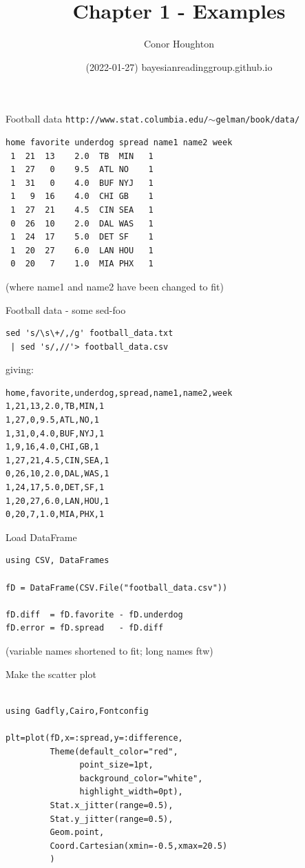 \documentclass{beamer}
\title[Chapter 1]{Chapter 1 - Examples}
\author{Conor Houghton}
\institute{reading Gelman}
\date{(2022-01-27) bayesianreadinggroup.github.io}
\begin{document}
\maketitle

\begin{frame}[fragile]{Football data}
\texttt{http://www.stat.columbia.edu/$\sim$gelman/book/data/}

\begin{verbatim}
home favorite underdog spread name1 name2 week
 1  21  13    2.0  TB  MIN   1
 1  27   0    9.5  ATL NO    1
 1  31   0    4.0  BUF NYJ   1
 1   9  16    4.0  CHI GB    1
 1  27  21    4.5  CIN SEA   1
 0  26  10    2.0  DAL WAS   1
 1  24  17    5.0  DET SF    1
 1  20  27    6.0  LAN HOU   1
 0  20   7    1.0  MIA PHX   1
\end{verbatim}
\vfill
\color{gray}
(where name1 and name2 have been changed to fit)
\color{black}
\end{frame}


\begin{frame}[fragile]{Football data - some sed-foo}
\begin{verbatim}
sed 's/\s\+/,/g' football_data.txt
 | sed 's/,//'> football_data.csv
\end{verbatim}
\color{red}giving:\color{black}
\begin{verbatim}
home,favorite,underdog,spread,name1,name2,week
1,21,13,2.0,TB,MIN,1
1,27,0,9.5,ATL,NO,1
1,31,0,4.0,BUF,NYJ,1
1,9,16,4.0,CHI,GB,1
1,27,21,4.5,CIN,SEA,1
0,26,10,2.0,DAL,WAS,1
1,24,17,5.0,DET,SF,1
1,20,27,6.0,LAN,HOU,1
0,20,7,1.0,MIA,PHX,1
\end{verbatim}
\end{frame}

\begin{frame}[fragile]{Load DataFrame}
\begin{lstlisting}
using CSV, DataFrames

fD = DataFrame(CSV.File("football_data.csv"))

fD.diff  = fD.favorite - fD.underdog
fD.error = fD.spread   - fD.diff
\end{lstlisting}
\vfill
\color{gray}
(variable names shortened to fit; long names ftw)
\color{black}

\end{frame}

\begin{frame}[fragile]{Make the scatter plot}
  \begin{lstlisting}

using Gadfly,Cairo,Fontconfig

plt=plot(fD,x=:spread,y=:difference,
         Theme(default_color="red",
               point_size=1pt,
               background_color="white",
               highlight_width=0pt),
         Stat.x_jitter(range=0.5),
         Stat.y_jitter(range=0.5),
         Geom.point,
         Coord.Cartesian(xmin=-0.5,xmax=20.5)
         )
  \end{lstlisting}
  \end{frame}
\end{document}
